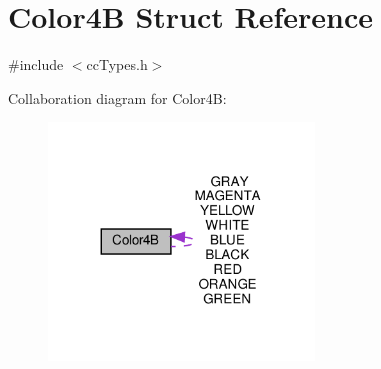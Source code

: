 \hypertarget{structColor4B}{}\section{Color4B Struct Reference}
\label{structColor4B}


{\ttfamily \#include $<$cc\+Types.\+h$>$}



Collaboration diagram for Color4B\+:
\nopagebreak
\begin{figure}[H]
\begin{center}
\leavevmode
\includegraphics[width=200pt]{structColor4B__coll__graph}
\end{center}
\end{figure}
